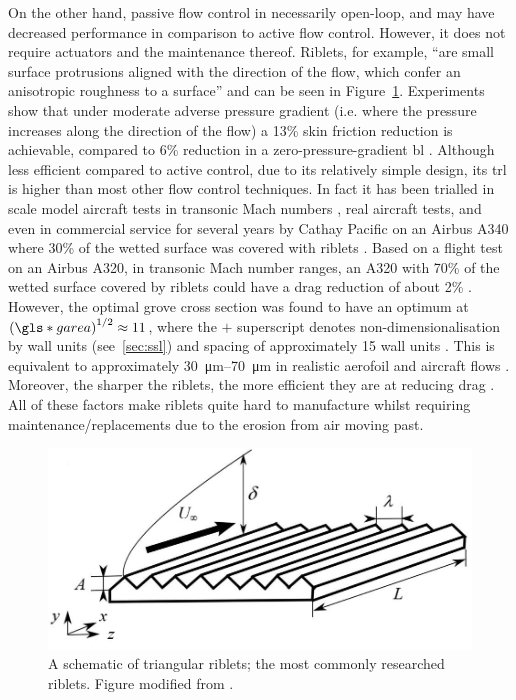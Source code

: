 On the other hand, passive flow control in necessarily open-loop, and may have decreased performance in comparison to active flow control. However, it does not require actuators and the maintenance thereof. Riblets, for example, ``are small surface protrusions aligned with the direction of the flow, which confer an anisotropic roughness to a surface'' \cite{garcia-mayoral2011} and can be seen in Figure~\ref{fig:riblets}. Experiments show that under moderate adverse pressure gradient (i.e. where the pressure increases along the direction of the flow) a 13\% skin friction reduction is achievable, compared to 6\% reduction in a zero-pressure-gradient \gls*{bl} \cite{debisschop1996}. Although less efficient compared to active control, due to its relatively simple design, its \gls*{trl} is higher than most other flow control techniques. In fact it has been trialled in scale model aircraft tests in transonic Mach numbers \cite{coustols1990}, real aircraft tests, and even in commercial service for several years by Cathay Pacific on an Airbus A340 where 30\% of the wetted surface was covered with riblets \cite{bechert2006}. Based on a flight test on an Airbus A320, in transonic Mach number ranges, an A320 with 70\% of the wetted surface covered by riblets could have a drag reduction of about 2\% \cite{szodruch1991}. However, the optimal grove cross section was found to have an optimum at $\left(\gls*{garea}\right)^{1 /2}\approx11$, where the $+$ superscript denotes non-dimensionalisation by wall units (see~\ref{sec:ssl}) and spacing of approximately 15 wall units \cite{garcia-mayoral2011}. This is equivalent to approximately \SIrange{30}{70}{\micro\metre} in realistic aerofoil and aircraft flows \cite{garcia-mayoral2011}. Moreover, the sharper the riblets, the more efficient they are at reducing drag \cite{garcia-mayoral2011}. All of these factors make riblets quite hard to manufacture whilst requiring maintenance/replacements due to the erosion from air moving past.

\begin{figure}[htbp]
\centering
\includegraphics[width=0.5\linewidth]{introduction/fig/riblets.jpeg}
\caption[Schematic of triangular riblets]{A schematic of triangular riblets; the most commonly researched riblets. Figure modified from \cite{raayai-ardakani2019}.}
\label{fig:riblets}
\end{figure}

